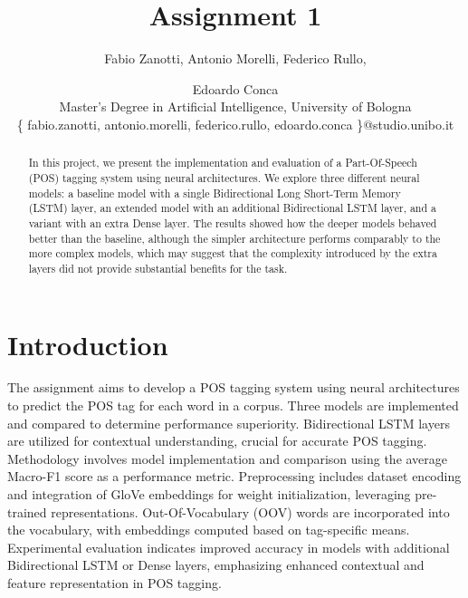 \documentclass[11pt]{article}
\begin{document}
%
\title{Assignment 1\\
}
\author{Fabio Zanotti,
Antonio Morelli,
Federico Rullo,
\and
Edoardo Conca\\
Master's Degree in Artificial Intelligence, University of Bologna\\
\{ fabio.zanotti, antonio.morelli, federico.rullo, edoardo.conca \}@studio.unibo.it
}
\maketitle

\begin{abstract}

In this project, we present the implementation and evaluation of a Part-Of-Speech (POS) tagging system using neural architectures. We explore three different neural models: a baseline model with a single Bidirectional Long Short-Term Memory (LSTM) layer, an extended model with an additional Bidirectional LSTM layer, and a variant with an extra Dense layer.  The results showed how the deeper models behaved better than the baseline, although the simpler architecture performs comparably to the more complex models, which may suggest that the complexity introduced by the extra layers did
not provide substantial benefits for the task.

\end{abstract}

\section{Introduction}
\label{sec:introduction}
The assignment aims to develop a POS tagging system using neural architectures to predict the POS tag for each word in a corpus. Three models are implemented and compared to determine performance superiority. Bidirectional LSTM layers are utilized for contextual understanding, crucial for accurate POS tagging. Methodology involves model implementation and comparison using the average Macro-F1 score as a performance metric. Preprocessing includes dataset encoding and integration of GloVe embeddings for weight initialization, leveraging pre-trained representations. Out-Of-Vocabulary (OOV) words are incorporated into the vocabulary, with embeddings computed based on tag-specific means. Experimental evaluation indicates improved accuracy in models with additional Bidirectional LSTM or Dense layers, emphasizing enhanced contextual and feature representation in POS tagging.
\end{document}
